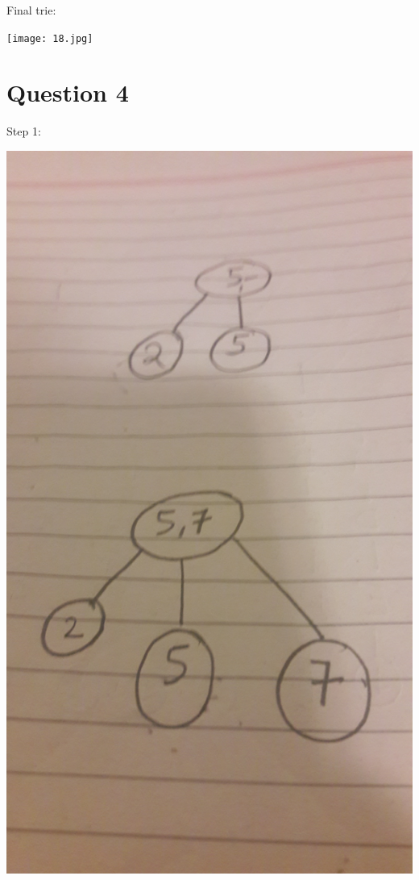 \documentclass{article}
\begin{document}
Final trie:



\texttt{[image: 18.jpg]}





\section*{Question 4}

Step 1:



\includegraphics[scale=0.05]{19.jpg}
\end{document}
